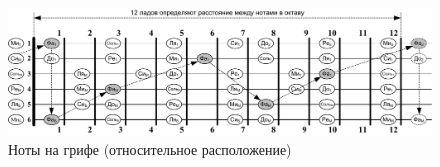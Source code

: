 \begin{figure}[!ht]
    \centering
    \includegraphics[width=\textwidth]{fig/notes-on-griph} 
    \caption{Ноты на грифе (относительное расположение)}\label{fig:notesOnGriph}
\end{figure} 


